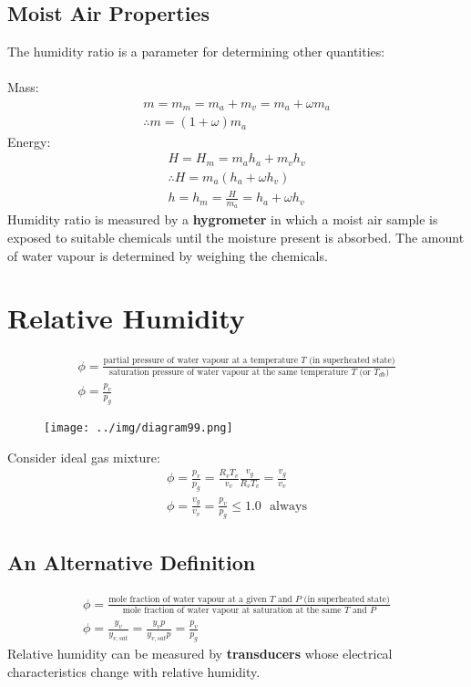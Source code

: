 \documentclass[class=report, crop=false, 12pt,a4paper]{standalone}
\numberwithin{equation}{section}
\begin{document}
\subsection{Moist Air Properties}
The humidity ratio is a parameter for determining other quantities: \\\\
Mass:
\begin{gather}
  m = m_m = m_a + m_v = m_a + \omega m_a \\[5pt]
  \therefore m = (1+\omega)m_a
\end{gather}
Energy:
\begin{gather}
  H = H_m = m_ah_a + m_vh_v \\[5pt]
  \therefore H = m_a(h_a + \omega h_v) \\[5pt]
  h = h_m = \frac{H}{m_a} = h_a + \omega h_v
\end{gather}
Humidity ratio is measured by a \textbf{hygrometer} in which a moist air sample is exposed to suitable chemicals until the moisture present is absorbed. The amount of water vapour is determined by weighing the chemicals.
\section{Relative Humidity}
\begin{gather}
  \phi = \frac{\text{partial pressure of water vapour at a temperature $T$ (in superheated state)}}{\text{saturation pressure of water vapour at the same temperature $T$ (or $T_{db}$)}} \\[5pt]
  \phi = \frac{p_v}{p_g}
\end{gather}
\begin{figure}[H]
  \centering
  \texttt{[image: ../img/diagram99.png]}
  \caption{}
\end{figure}
Consider ideal gas mixture:
\begin{gather}
  \phi = \frac{p_v}{p_g} = \frac{R_v T_v}{v_v}\frac{v_g}{R_v T_v} = \frac{v_g}{v_v} \\[5pt]
  \phi = \frac{v_g}{v_v} = \frac{p_v}{p_g} \leq 1.0 \ \ \ \text{always}
\end{gather}
\subsection{An Alternative Definition}
\begin{gather}
  \phi = \frac{\text{mole fraction of water vapour at a given $T$ and $P$ (in superheated state)}}{\text{mole fraction of water vapour at saturation at the same $T$ and $P$}} \\[5pt]
  \phi = \frac{y_v}{y_{v,sat}} = \frac{y_vp}{y_{v,sat}p} = \frac{p_v}{p_g}
\end{gather}
Relative humidity can be measured by \textbf{transducers} whose electrical characteristics change with relative humidity.
\end{document}
